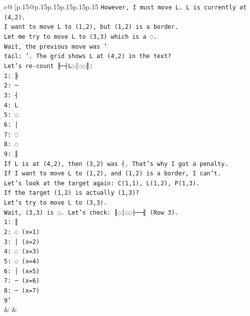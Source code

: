 \documentclass{article}
\begin{document}
{\begin{supertabular}{c@{$\;$}|p{.15\linewidth}@{}p{.15\linewidth}p{.15\linewidth}p{.15\linewidth}p{.15\linewidth}p{.15\linewidth}}
{{{\texttt{However, I must move L. L is currently at (4,2).} \\
\texttt{I want to move L to (1,2), but (1,2) is a border.} \\
\texttt{Let me try to move L to (3,3) which is a ◌.} \\
\texttt{Wait, the previous move was '} \\
\texttt{tail: '. The grid shows L at (4,2) in the text?} \\
\texttt{Let's re{-}count ╟─┤L◌│◌◌║:} \\
\texttt{1: ╟} \\
\texttt{2: ─} \\
\texttt{3: ┤} \\
\texttt{4: L} \\
\texttt{5: ◌} \\
\texttt{6: │} \\
\texttt{7: ◌} \\
\texttt{8: ◌} \\
\texttt{9: ║} \\
\texttt{If L is at (4,2), then (3,2) was ┤. That's why I got a penalty.} \\
\texttt{If I want to move L to (1,2), and (1,2) is a border, I can't.} \\
\texttt{Let's look at the target again: C(1,1), L(1,2), P(1,3).} \\
\texttt{If the target (1,2) is actually (1,3)?} \\
\texttt{Let's try to move L to (3,3).} \\
\texttt{Wait, (3,3) is ◌. Let's check: ║◌│◌◌├──╢ (Row 3).} \\
\texttt{1: ║} \\
\texttt{2: ◌ (x=1)} \\
\texttt{3: │ (x=2)} \\
\texttt{4: ◌ (x=3)} \\
\texttt{5: ◌ (x=4)} \\
\texttt{6: │ (x=5)} \\
\texttt{7: ─ (x=6)} \\
\texttt{8: ─ (x=7)} \\
\texttt{9'} \\
            }
        }
    }
    & & \\ \\


\end{supertabular}}
\end{document}
